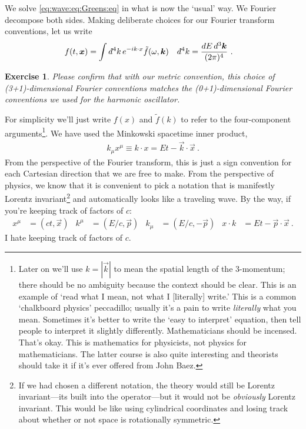 \documentclass[
  11pt,
	colorful,
	raggedright,
]{tufte-style-thesis-flip}
\newtheorem{exercise}{Exercise}[section]
\renewcommand{\dbar}{d\hspace*{-0.08em}\bar{}\hspace*{0.1em}}
\begin{document}
We solve \eqref{eq:wave:eq:Greens:eq} in what is now the `usual' way. We Fourier decompose both sides. Making deliberate choices for our Fourier transform conventions, let us write
\begin{align}
  f(t,\vec{x}) &= \int \dbar^4k \, e^{-ik\cdot x} \tilde f(\omega, \vec{k})
  &
  \dbar^4k &= \frac{dE\, d^3\vec{k}}{(2\pi)^4}
   \ .
\end{align}
\begin{exercise}
Please confirm that with our metric convention, this choice of (3+1)-dimensional Fourier conventions matches the (0+1)-dimensional Fourier conventions we used for the harmonic oscillator.
\end{exercise}
For simplicity we'll just write $f(x)$ and $\tilde f(k)$ to refer to the four-component arguments\footnote{Later on we'll use $k=|\vec{k}|$ to mean the spatial length of the 3-momentum; there should be no ambiguity because the context should be clear. This is an example of `read what I mean, not what I [literally] write.' This is a common `chalkboard physics' peccadillo; usually it's a pain to write \emph{literally} what you mean. Sometimes it's better to write the `easy to interpret' equation, then tell people to interpret it slightly differently. Mathematicians should be incensed. That's okay. This is mathematics for physicists, not physics for mathematicians. The latter course is also quite interesting and theorists should take it if it's ever offered from John Baez.}. 
We have used the Minkowski spacetime inner product,
\begin{align}
  k_\mu x^\mu \equiv k\cdot x = Et - \vec{k}\cdot\vec{x} \ .
\end{align}
From the perspective of the Fourier transform, this is just a sign convention for each Cartesian direction that we are free to make. From the perspective of physics, we know that it is convenient to pick a notation that is manifestly Lorentz invariant\footnote{If we had chosen a different notation, the theory would still be Lorentz invariant---its built into the operator---but it would not be \emph{obviously} Lorentz invariant. This would be like using cylindrical coordinates and losing track about whether or not space is rotationally symmetric.} and automatically looks like a traveling wave. By the way, if you're keeping track of factors of $c$:
\begin{align}
  x^\mu &= (ct,\vec{x})
  &
  k^\mu &= (E/c,\vec{p})
  &
  k_\mu &= (E/c, -\vec{p})
  &
  x\cdot k  &= Et - \vec{p}\cdot\vec{x} \ .
\end{align}
I hate keeping track of factors of $c$. 
\end{document}
